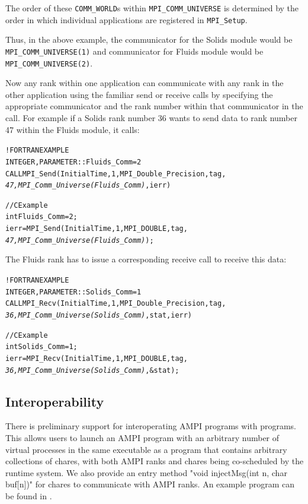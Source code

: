 \documentclass[10pt]{article}
\begin{document}
The order of these \texttt{COMM\_WORLD}s within \texttt{MPI\_COMM\_UNIVERSE}
is determined by the order in which individual applications are registered in
\texttt{MPI\_Setup}.

Thus, in the above example, the communicator for the Solids module would be
\texttt{MPI\_COMM\_UNIVERSE(1)} and communicator for Fluids module would be
\texttt{MPI\_COMM\_UNIVERSE(2)}.

Now any rank within one application can communicate with any rank in the
other application using the familiar send or receive \ampi{} calls by
specifying the appropriate communicator and the rank number within that
communicator in the call. For example if a Solids rank number 36 wants to send
data to rank number 47 within the Fluids module, it calls:

\begin{alltt}
!FORTRAN EXAMPLE
INTEGER , PARAMETER :: Fluids_Comm = 2
CALL MPI_Send(InitialTime, 1, MPI_Double_Precision, tag, 
              \emph{47, MPI_Comm_Universe(Fluids_Comm)}, ierr)

//C Example
int Fluids_Comm = 2;
ierr = MPI_Send(InitialTime, 1, MPI_DOUBLE, tag,
                \emph{47, MPI_Comm_Universe(Fluids_Comm)});
\end{alltt}

The Fluids rank has to issue a corresponding receive call to receive this
data:

\begin{alltt}
!FORTRAN EXAMPLE
INTEGER , PARAMETER :: Solids_Comm = 1
CALL MPI_Recv(InitialTime, 1, MPI_Double_Precision, tag, 
              \emph{36, MPI_Comm_Universe(Solids_Comm)}, stat, ierr)

//C Example
int Solids_Comm = 1;
ierr = MPI_Recv(InitialTime, 1, MPI_DOUBLE, tag,
                \emph{36, MPI_Comm_Universe(Solids_Comm)}, &stat);
\end{alltt}

\subsection{\charmpp{} Interoperability}
There is preliminary support for interoperating AMPI programs with \charmpp{}
programs. This allows users to launch an AMPI program with an arbitrary number
of virtual processes in the same executable as a \charmpp{} program that contains
arbitrary collections of chares, with both AMPI ranks and chares being co-scheduled
by the runtime system. We also provide an entry method "void injectMsg(int n, char buf[n])"
for chares to communicate with AMPI ranks. An example program can be found in
.
\end{document}
